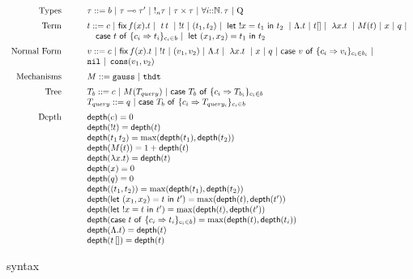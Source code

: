 
\begin{figure}[h]
 $$
 \begin{array}{rcl}
     \text{Types} & \quad & \tau ::= b \sep \tau \multimap \tau' \sep !_n \tau \sep
     \tau \times \tau \sep \tforallN{i}{\tau} \sep \query \\[2mm]

     \text{Term} & \quad & t ::= c \sep \fix{t} \sep \app{t}{t} \sep !t \sep (t_1,t_2) \sep  \letx{!x}{t_1}{t_2} \sep \Lambda.t \sep t[] \sep \abs{x}{t} \sep  M(t) \sep x \sep q \sep\\
     && \quad   \tcaseof{t}\ \{c_i \Rightarrow t_i\}_{c_i \in b}  \sep \letx{(x_1,x_2)}{t_1}{t_2} \\[2mm]
      
     \text{Normal Form} &\quad & v ::=  c \sep \fix{t} \sep !t \sep (v_1, v_2) \sep \Lambda. t \sep \abs{x}{t}  \sep x \sep q \sep \tcaseof{v}\ \{c_i \Rightarrow v_i\}_{c_i \in b_i} \sep\\
     && \enil \sep \econs(v_1,v_2)  \\[2mm]

     \text{Mechanisms} &\quad & M ::=  {\tt gauss} \sep {\tt thdt} \\[2mm]


	\text{Tree} &\quad& T_b :: = c \sep M(T_{query}) \sep \tcaseof{T_b}\ \{ c_i \Rightarrow T_{b_i}\}_{c_i \in b} \\

	\text{} &\quad& T_{query} :: = q \sep \tcaseof{T_b}\ \{ c_i \Rightarrow T_{query_i}\}_{c_i \in b} \\[2mm]
     \text{Depth} &\quad&   \depth(c) = 0 \\
       &\quad& \depth(!t) = \depth(t) \\
           &\quad&      \depth( \app{t_1}{t_2} ) = \max(\depth(t_1), \depth(t_2)) \\
            &\quad&  \depth(M(t)) = 1 + \depth(t) \\
             &\quad&  \depth(\abs{x}{t}) = \depth(t) \\
              &\quad& \depth(x) = 0 \\
              & \quad & \depth(q) = 0 \\
              & \quad & \depth((t_1, t_2)) = \max(\depth(t_1), \depth(t_2))\\
              & \quad & \depth(\letx{(x_1, x_2)}{t}{t'}) = \max(\depth(t), \depth(t'))\\
              & \quad & \depth{}(\letx{!x}{t}{t'}) = \max(\depth(t), \depth(t'))\\
              & \quad & \depth{}(\tcaseof{t}\ \{c_i \Rightarrow t_i\}_{c_i \in b}) = \max(\depth(t), \depth(t_i))\\
            & \quad & \depth(\Lambda.t) = \depth(t)\\
              & \quad & \depth(t\, []) = \depth(t)\\
\end{array}
$$
\caption{syntax}
\end{figure}

